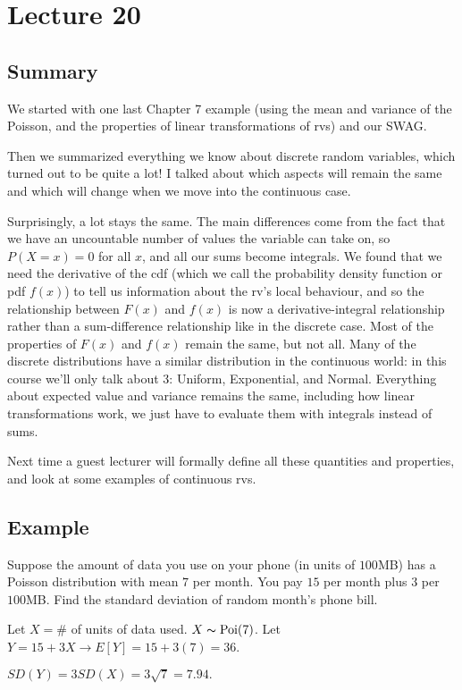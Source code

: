 \section{Lecture 20}
\subsection{Summary}
We started with one last Chapter 7 example (using the mean and variance of the Poisson, and the properties of linear transformations of rvs) and our SWAG.

Then we summarized everything we know about discrete random variables, which turned out to be quite a lot! I talked about which aspects will remain the same and which will change when we move into the continuous case.

Surprisingly, a lot stays the same. The main differences come from the fact that we have an uncountable number of values the variable can take on, so $P(X=x) = 0$ for all $x$, and all our sums become integrals. We found that we need the derivative of the cdf (which we call the probability density function or pdf $f(x)$) to tell us information about the rv's local behaviour, and so the relationship between $F(x)$ and $f(x)$ is now a derivative-integral relationship rather than a sum-difference relationship like in the discrete case. Most of the properties of $F(x)$ and $f(x)$ remain the same, but not all. Many of the discrete distributions have a similar distribution in the continuous world: in this course we'll only talk about 3: Uniform, Exponential, and Normal. Everything about expected value and variance remains the same, including how linear transformations work, we just have to evaluate them with integrals instead of sums.

Next time a guest lecturer will formally define all these quantities and properties, and look at some examples of continuous rvs.

\subsection{Example}
Suppose the amount of data you use on your phone (in units of $ 100 $MB) has
a Poisson distribution with mean $ 7 $ per month. You pay $ 15 $ per
month plus $ 3 $ per $ 100 $MB. Find the standard deviation of random
month's phone bill.

Let $ X= $\# of units of data used. $ X \thicksim \operatorname{Poi}(7) $. Let
$ Y=15+3X\rightarrow E[Y]=15+3(7)=36 $. 

$ SD(Y)=3SD(X)=3\sqrt{7}=7.94. $